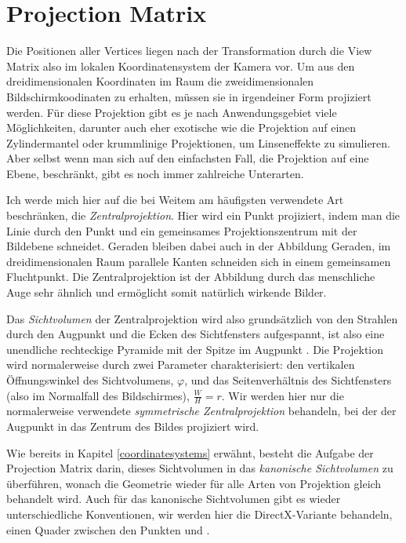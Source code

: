 \section{Projection Matrix}
\label{projection}
Die Positionen aller Vertices liegen nach der Transformation durch die View Matrix also im lokalen Koordinatensystem der Kamera vor. Um aus den dreidimensionalen Koordinaten im Raum die zweidimensionalen Bildschirmkoodinaten zu erhalten, müssen sie in irgendeiner Form projiziert werden. Für diese Projektion gibt es je nach Anwendungsgebiet viele Möglichkeiten, darunter auch eher exotische wie die Projektion auf einen Zylindermantel oder krummlinige Projektionen, um Linseneffekte zu simulieren. Aber selbst wenn man sich auf den einfachsten Fall, die Projektion auf eine Ebene, beschränkt, gibt es noch immer zahlreiche Unterarten. 

Ich werde mich hier auf die bei Weitem am häufigsten verwendete Art beschränken, die \emph{Zentralprojektion}. Hier wird ein Punkt projiziert, indem man die Linie durch den Punkt und ein gemeinsames Projektionszentrum mit der Bildebene schneidet. Geraden bleiben dabei auch in der Abbildung Geraden, im dreidimensionalen Raum parallele Kanten schneiden sich in einem gemeinsamen Fluchtpunkt. Die Zentralprojektion ist der Abbildung durch das menschliche Auge sehr ähnlich und ermöglicht somit natürlich wirkende Bilder. 


Das \emph{Sichtvolumen} der Zentralprojektion wird also grundsätzlich von den Strahlen durch den Augpunkt und die Ecken des Sichtfensters aufgespannt, ist also eine unendliche rechteckige Pyramide mit der Spitze im Augpunkt . Die Projektion wird normalerweise durch zwei Parameter charakterisiert: den vertikalen Öffnungswinkel des Sichtvolumens, $\varphi$, und das Seitenverhältnis des Sichtfensters (also im Normalfall des Bildschirmes), $\frac{W}{H} = r$. Wir werden hier nur die normalerweise verwendete \emph{symmetrische Zentralprojektion} behandeln, bei der der Augpunkt in das Zentrum des Bildes projiziert wird.

Wie bereits in Kapitel \ref{coordinatesystems} erwähnt, besteht die Aufgabe der Projection Matrix darin, dieses Sichtvolumen in das \emph{kanonische Sichtvolumen} zu überführen, wonach die Geometrie wieder für alle Arten von Projektion gleich behandelt wird. Auch für das kanonische Sichtvolumen gibt es wieder unterschiedliche Konventionen, wir werden hier die DirectX-Variante behandeln, einen Quader zwischen den Punkten  und . 

